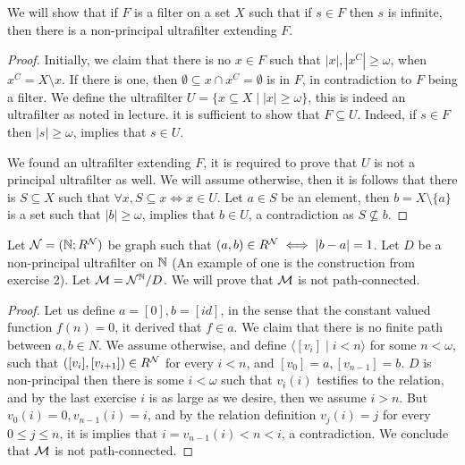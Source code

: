 \question{}
We will show that if $F$ is a filter on a set $X$ such that if $s \in F$ then $s$ is infinite, then there is a non-principal ultrafilter extending $F$.
\begin{proof}
	Initially, we claim that there is no $x \in F$ such that $|x|, |x^C| \ge \omega$, when $x^C = X \setminus x$.
	If there is one, then $\emptyset \subseteq x \cap x^C = \emptyset$ is in $F$, in contradiction to $F$ being a filter.
	We define the ultrafilter $U = \{ x \subseteq X \mid |x| \ge \omega \}$, this is indeed an ultrafilter as noted in lecture.
	it is sufficient to show that $F \subseteq U$.
	Indeed, if $s \in F$ then $|s| \ge \omega$, implies that $s \in U$.

	We found an ultrafilter extending $F$, it is required to prove that $U$ is not a principal ultrafilter as well.
	We will assume otherwise, then it is follows that there is $S \subseteq X$ such that $\forall x, S \subseteq x \iff x \in U$.
	Let $a \in S$ be an element, then $b = X \setminus \{a\}$ is a set such that $|b| \ge \omega$, implies that $b \in U$, a contradiction as $S \not\subseteq b$.
\end{proof}

\question{}
\subquestion{}
Let $\mathcal{N} = (\mathbb{N}; R^{\mathcal{N}})$ be graph such that $(a, b) \in R^{\mathcal{N}} \iff |b - a| = 1$.
Let $D$ be a non-principal ultrafilter on $\mathbb{N}$ (An example of one is the construction from exercise 2).
Let $\mathcal{M} = \mathcal{N}^{\mathbb{N}} / D$.
We will prove that $\mathcal{M}$ is not path-connected.
\begin{proof}
	Let us define $a = [0], b = [id]$, in the sense that the constant valued function $f(n) = 0$, it derived that $f \in a$.
	We claim that there is no finite path between $a, b \in N$.
	We assume otherwise, and define $\langle [v_i] \mid i < n \rangle$ for some $n < \omega$, such that $([v_i], [v_{i + 1}]) \in R^{\mathcal{N}}$ for every $i < n$, and $[v_0] = a, [v_{n - 1}] = b$.
	$D$ is non-principal then there is some $i < \omega$ such that $v_i(i)$ testifies to the relation, and by the last exercise $i$ is as large as we desire, then we assume $i > n$.
	But $v_0(i) = 0, v_{n - 1}(i) = i$, and by the relation definition $v_j(i) = j$ for every $0 \le j \le n$, it is implies that $i = v_{n - 1}(i) < n < i$, a contradiction.
	We conclude that $\mathcal{M}$ is not path-connected.
\end{proof}

